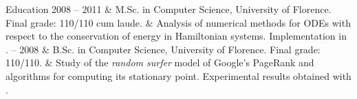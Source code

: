 \begin{cvsection}{Education}
2008 -- 2011 & M.Sc. in Computer Science, University of Florence. Final grade: 110/110 cum laude.\spacednewline
	& Analysis of numerical methods for ODEs with respect to the conservation of energy in Hamiltonian systems. Implementation in . -- 2008 & B.Sc. in Computer Science, University of Florence. Final grade: 110/110.\spacednewline
	& Study of the \emph{random surfer} model of Google's PageRank and algorithms for computing its stationary point. Experimental results obtained with .
\end{cvsection}